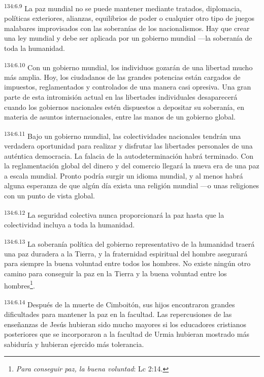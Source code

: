 \par
\textsuperscript{134:6.9} La paz mundial no se puede mantener mediante tratados, diplomacia, políticas exteriores, alianzas, equilibrios de poder o cualquier otro tipo de juegos malabares improvisados con las soberanías de los nacionalismos. Hay que crear una ley mundial y debe ser aplicada por un gobierno mundial ---la soberanía de toda la humanidad.

\par
\textsuperscript{134:6.10} Con un gobierno mundial, los individuos gozarán de una libertad mucho más amplia. Hoy, los ciudadanos de las grandes potencias están cargados de impuestos, reglamentados y controlados de una manera casi opresiva. Una gran parte de esta intromisión actual en las libertades individuales desaparecerá cuando los gobiernos nacionales estén dispuestos a depositar su soberanía, en materia de asuntos internacionales, entre las manos de un gobierno global.

\par
\textsuperscript{134:6.11} Bajo un gobierno mundial, las colectividades nacionales tendrán una verdadera oportunidad para realizar y disfrutar las libertades personales de una auténtica democracia. La falacia de la autodeterminación habrá terminado. Con la reglamentación global del dinero y del comercio llegará la nueva era de una paz a escala mundial. Pronto podría surgir un idioma mundial, y al menos habrá alguna esperanza de que algún día exista una religión mundial ---o unas religiones con un punto de vista global.

\par
\textsuperscript{134:6.12} La seguridad colectiva nunca proporcionará la paz hasta que la colectividad incluya a toda la humanidad.

\par
\textsuperscript{134:6.13} La soberanía política del gobierno representativo de la humanidad traerá una paz duradera a la Tierra, y la fraternidad espiritual del hombre asegurará para siempre la buena voluntad entre todos los hombres. No existe ningún otro camino para conseguir la paz en la Tierra y la buena voluntad entre los hombres\footnote{\textit{Para conseguir paz, la buena voluntad}: Lc 2:14.}.

\par
\textsuperscript{134:6.14} Después de la muerte de Cimboitón, sus hijos encontraron grandes dificultades para mantener la paz en la facultad. Las repercusiones de las enseñanzas de Jesús hubieran sido mucho mayores si los educadores cristianos posteriores que se incorporaron a la facultad de Urmia hubieran mostrado más sabiduría y hubieran ejercido más tolerancia.

